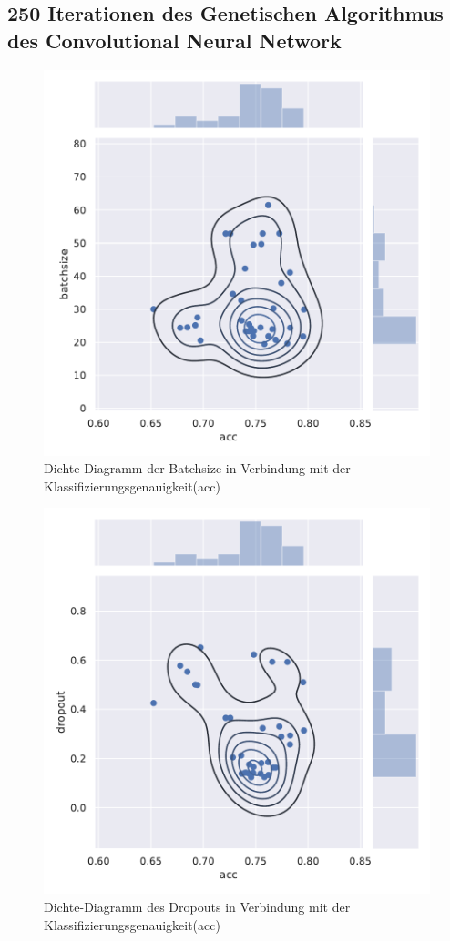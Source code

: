 \subsection{250 Iterationen des Genetischen Algorithmus des Convolutional Neural Network}
\begin{figure}[H]
  \centering  
  \includegraphics[scale=0.5]{anhang/GA_250_cifar10_False_big_jointplot_batchsize.pdf}
  \caption{Dichte-Diagramm der Batchsize in Verbindung mit der Klassifizierungsgenauigkeit(acc)}
\end{figure}

\begin{figure}[H]
  \centering  
  \includegraphics[scale=0.5]{anhang/GA_250_cifar10_False_big_jointplot_dropout.pdf}
  \caption{Dichte-Diagramm des Dropouts in Verbindung mit der Klassifizierungsgenauigkeit(acc)}
\end{figure}

